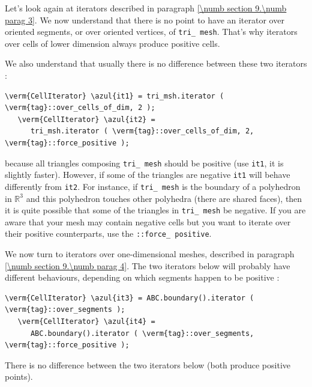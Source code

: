 Let's look again at iterators described in paragraph \ref{\numb section 9.\numb parag 3}.
We now understand that there is no point to have an iterator over oriented
segments, or over oriented vertices, of {\small\tt tri\_\,mesh}.
That's why iterators over cells of lower dimension always produce positive cells.

We also understand that usually there is no difference between these two iterators :

\begin{Verbatim}[commandchars=\\\{\},formatcom=\small\tt,
   baselinestretch=0.94,framesep=2mm                      ]
   \verm{CellIterator} \azul{it1} = tri_msh.iterator ( \verm{tag}::over_cells_of_dim, 2 );
   \verm{CellIterator} \azul{it2} =
      tri_msh.iterator ( \verm{tag}::over_cells_of_dim, 2, \verm{tag}::force_positive );
\end{Verbatim}

\noindent because all triangles composing {\small\tt tri\_\,mesh} should be positive
(use {\small\tt it1}, it is slightly faster).
However, if some of the triangles are negative {\small\tt it1} will behave differently from
{\small\tt it2}.
For instance, if {\small\tt tri\_\,mesh} is the boundary of a polyhedron in $ \mathbb{R}^3 $
and this polyhedron touches other polyhedra (there are shared faces), then it is
quite possible that some of the triangles in {\small\tt tri\_\,mesh} be negative.
If you are aware that your mesh may contain negative cells but
you want to iterate over their positive counterparts, use the {\small\tt {}::force\_\,positive}.

We now turn to iterators over one-dimensional meshes, described in paragraph
\ref{\numb section 9.\numb parag 4}.
The two iterators below will probably have different behaviours,
depending on which segments happen to be positive :

\begin{Verbatim}[commandchars=\\\{\},formatcom=\small\tt,
   baselinestretch=0.94,framesep=2mm                      ]
   \verm{CellIterator} \azul{it3} = ABC.boundary().iterator ( \verm{tag}::over_segments );
   \verm{CellIterator} \azul{it4} =
      ABC.boundary().iterator ( \verm{tag}::over_segments, \verm{tag}::force_positive );
\end{Verbatim}

There is no difference between the two iterators below (both produce positive
points).

